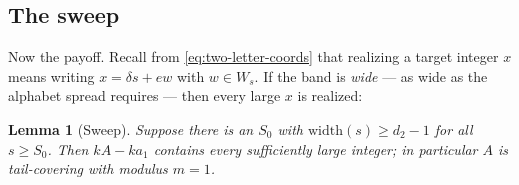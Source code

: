 \documentclass[11pt,reqno]{amsart}
\theoremstyle{plain}
\newtheorem{lemma}[theorem]{Lemma}
\theoremstyle{definition}
\theoremstyle{remark}
\begin{document}
\subsection{The sweep}

Now the payoff. Recall from \eqref{eq:two-letter-coords} that realizing a target
integer $x$ means writing $x = \delta s + e w$ with $w \in W_s$. If the band is
\emph{wide} --- as wide as the alphabet spread requires --- then every large $x$ is
realized:

\begin{lemma}[Sweep]\label{lem:sweep-friendly}
Suppose there is an $S_0$ with $\mathrm{width}(s) \ge d_2 - 1$ for all $s \ge S_0$.
Then $kA - k a_1$ contains every sufficiently large integer; in particular $A$ is
tail-covering with modulus $m = 1$.
\end{lemma}
\end{document}
